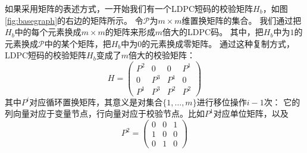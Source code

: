 如果采用矩阵的表述方式，一开始我们有一个LDPC短码的校验矩阵$H_b$，如图\ref{fig:basegraph}的右边的矩阵所示。
令$\mathcal{P}$为$m\times m$维置换矩阵的集合。
我们通过把$H_b$中的每个元素换成$m\times m$的矩阵来形成$m$倍大的LDPC码。
其中，把$H_b$中为$1$的元素换成$\mathcal{P}$中的某个矩阵，把$H_b$中为$0$的元素换成零矩阵。
通过这种复制方式，LDPC短码的校验矩阵$H_b$变成了$m$倍大的校验矩阵：
\begin{equation}
    H = \left(
      \begin{array}{cccc}
        P^2 & 0 & 0 & P^1 \\
        0 & P^3 & P^1 & 0 \\
        P^1 & P^3 & P^2 & P^2 
      \end{array} \right)
\end{equation}
其中$P^i$对应循环置换矩阵，其意义是对集合$\{1,\dots,m\}$进行移位操作$i-1$次：
它的列向量对应于变量节点，行向量对应于校验节点。比如$P^1$对应单位矩阵，以及
\begin{equation}
    P^2 = \left(
      \begin{array}{ccc}
        0 & 0 & 1 \\
        1 & 0 & 0 \\
        0 & 1 & 0
      \end{array} \right)
\end{equation}


